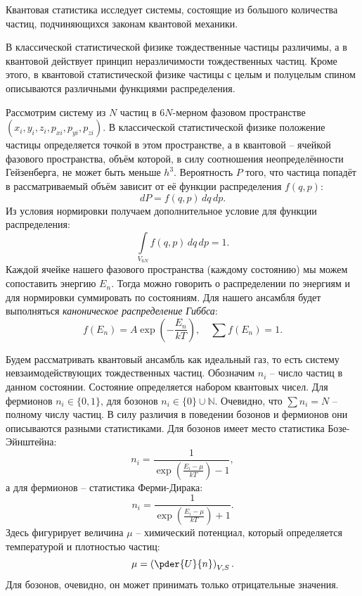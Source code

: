 
Квантовая статистика исследует системы, состоящие из большого количества частиц,
подчиняющихся законам квантовой механики.

В классической статистической физике тождественные частицы различимы, а
в квантовой действует принцип неразличимости тождественных частиц. Кроме этого,
в квантовой статистической физике частицы с целым и полуцелым спином описываются
различными функциями распределения.

Рассмотрим систему из \( N \) частиц в \( 6N \)-мерном фазовом пространстве
\( (x_i, y_i, z_i, p_{xi}, p_{yi}, p_{zi}) \). В классической статистической
физике положение частицы определяется точкой в этом пространстве, а в квантовой
-- ячейкой фазового пространства, объём которой, в силу соотношения
неопределённости Гейзенберга, не может быть меньше \( h^3 \). Вероятность
\( P \) того, что частица попадёт в рассматриваемый объём зависит от её функции
распределения \( f(q,p) \):
\[
    dP = f(q,p)\,dq\,dp.
\]
Из условия нормировки получаем дополнительное условие для функции распределения:
\[
    \int\limits_{V_{6N}} f(q,p)\,dq\,dp = 1.
\]
Каждой ячейке нашего фазового пространства (каждому состоянию) мы можем
сопоставить энергию \( E_n \). Тогда можно говорить о распределении по энергиям
и для нормировки суммировать по состояниям. Для нашего ансамбля будет
выполняться \emph{каноническое распределение Гиббса}:
\[
    f(E_n) = A\exp(-\frac{E_n}{kT}),\quad\sum f(E_n) = 1.
\]

Будем рассматривать квантовый ансамбль как идеальный газ, то есть систему
невзаимодействующих тождественных частиц. Обозначим \( n_i \) -- число
частиц в данном состоянии. Состояние определяется набором квантовых чисел.
Для фермионов \( n_i\in\{0,1\} \), для бозонов \( n_i\in\{0\}\cup\mathbb{N} \).
Очевидно, что \( \sum n_i = N \) -- полному числу частиц.
В силу различия в поведении бозонов и фермионов они описываются разными
статистиками. Для бозонов имеет место статистика Бозе-Эйнштейна:
\[
    n_i = \frac{1}{\exp(\frac{E_i-\mu}{kT}) - 1},
\]
а для фермионов -- статистика Ферми-Дирака:
\[
    n_i = \frac{1}{\exp(\frac{E_i-\mu}{kT}) + 1}.
\]
Здесь фигурирует величина \( \mu \) -- химический потенциал, который
определяется температурой и плотностью частиц:
\[
    \mu = \left(\pder{U}{n}\right)_{V,S}.
\]
Для бозонов, очевидно, он может принимать только отрицательные значения.

